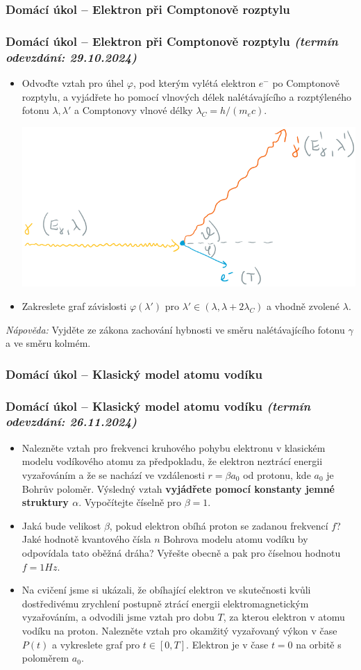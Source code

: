 \documentclass[a4paper,11pt,twoside]{article}
\newenvironment{homework}{}{}
\newcommand{\np}{\clearpage\newpage}
\newcommand{\exercise}[2][]{\ifthenelse{\isempty{#1}}
	{\np\thispagestyle{empty}\subsubsection*{Domácí úkol -- #2}}
	{\np\thispagestyle{empty}\np\subsubsection*{Domácí úkol -- #2 \small{\it{(termín odevzdání: {#1})}}}}
}
\begin{document}
\begin{homework}
\exercise[29.10.2024]{Elektron při Comptonově rozptylu}
	\begin{itemize}
	\item
		Odvoďte vztah pro úhel $\varphi$, pod kterým vylétá elektron $e^{-}$ po Comptonově rozptylu, a vyjádřete ho pomocí vlnových délek nalétávajícího a rozptýleného fotonu $\lambda,\lambda'$ a Comptonovy vlnové délky $\lambda_{C}=h/(m_{e}c)$.
		\begin{center}
			\includegraphics[width=0.8\linewidth]{Compton.png}
		\end{center}
	
	\item 
		Zakreslete graf závislosti $\varphi(\lambda')$ pro $\lambda'\in(\lambda,\lambda+2\lambda_{C})$ a vhodně zvolené $\lambda$.

	\end{itemize}
	\emph{Nápověda:} Vyjděte ze zákona zachování hybnosti ve směru nalétávajícího fotonu $\gamma$ a ve směru kolmém.
\end{homework}

\begin{homework}
	\exercise[26.11.2024]{Klasický model atomu vodíku}
	\begin{itemize}
		\item     
			Nalezněte vztah pro frekvenci kruhového pohybu elektronu v klasickém modelu vodíkového atomu za předpokladu, že elektron neztrácí energii vyzařováním a že se nachází ve vzdálenosti $r=\beta a_{0}$ od protonu, kde $a_{0}$ je Bohrův poloměr.
			Výsledný vztah {\bf vyjádřete pomocí konstanty jemné struktury $\alpha$}.
			Vypočítejte číselně pro $\beta=1$.

		\item
			Jaká bude velikost $\beta$, pokud elektron obíhá proton se zadanou frekvencí $f$?
			Jaké hodnotě kvantového čísla $n$ Bohrova modelu atomu vodíku by odpovídala tato oběžná dráha?
			Vyřešte obecně a pak pro číselnou hodnotu $f=1\unit{Hz}$.

		\item
			Na cvičení jsme si ukázali, že obíhající elektron ve skutečnosti kvůli dostředivému zrychlení postupně ztrácí energii elektromagnetickým vyzařováním, a odvodili jsme vztah pro dobu $T$, za kterou elektron v atomu vodíku  na proton.
			Nalezněte vztah pro okamžitý vyzařovaný výkon v čase $P(t)$ a vykreslete graf pro $t\in[0,T]$.
			Elektron je v čase $t=0$ na orbitě s poloměrem $a_{0}$.
	\end{itemize}
\end{homework}
\end{document}
